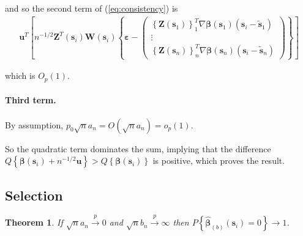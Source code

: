 \documentclass[authoryear, review, 11pt]{elsarticle}
\newtheorem{theorem}{Theorem}[section]
\begin{document}
  and so the second term of (\ref{eq:consistency}) is
  \begin{align*}
    \bm{u}^T \left[ n^{-1/2} \bm{Z}^T(\bm{s}_i) \bm{W}(\bm{s}_i) \left\{ \bm{\varepsilon} - \left( \begin{array}{c} \left\{ \bm{Z}(\bm{s}_1) \right\}^T_1  \nabla \bm{\beta}(\bm{s}_1) (\bm{s}_i - \tilde{\bm{s}}_1) \\ \vdots \\ \left\{ \bm{Z}(\bm{s}_n) \right\}^T_n \nabla \bm{\beta}(\bm{s}_n) (\bm{s}_i - \tilde{\bm{s}}_n) \end{array} \right)  \right\} \right]
  \end{align*}
  
  which is $O_p(1)$.
  
  \paragraph{Third term.} By assumption, $p_0 \sqrt{n} a_n = O(\sqrt{n} a_n) = o_p(1)$.
  
  So the quadratic term dominates the sum, implying that the difference $Q \left\{ \bm{\beta}(\bm{s}_i) + n^{-1/2} \bm{u} \right\} > Q \left\{ \bm{\beta}(\bm{s}_i) \right\}$ is positive, which proves the result.
  
  \subsection{Selection}
    
    \begin{theorem}\label{theorem:selection}   
      If $\sqrt{n} a_n \xrightarrow{p} 0$ and $\sqrt{n} b_n \xrightarrow{p} \infty$ then $P \left\{ \hat{\bm{\beta}}_{(b)} (\bm{s}_i) = 0 \right\} \to 1$.
    \end{theorem}
\end{document}

